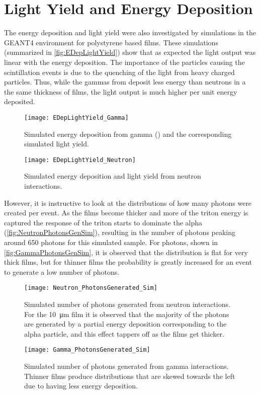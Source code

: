 \section{Light Yield and Energy Deposition}
The energy deposition and light yield were also investigated by simulations in the GEANT4 environment for polystyrene based films.
These simulations (summarized in \autoref{fig:EDepLightYield}) show that as expected the light output was linear with the energy deposition.
The importance of the particles causing the scintillation events is due to the quenching of the light from heavy charged particles.
Thus, while the gammas from  deposit  less energy than neutrons in a the same thickness of films, the light output is much higher per unit energy deposited.
\begin{figure}
 	\centering
  	\texttt{[image: EDepLightYield\_Gamma]}
		\caption[Energy Deposition and Light Yield in Polystyrene from Co-60 Photons]{Simulated energy deposition from gamma () and the corresponding simulated light yield. \SimEDeLYGeo}
\end{figure}
\begin{figure}
 	\centering
  	\texttt{[image: EDepLightYield\_Neutron]}
  	\caption[Energy Deposition and Light Yield in Polystyrene from Neutrons]{Simulated energy deposition and light yield from neutron interactions.  \SimEDeLYGeo}
  \label{fig:EDepLightYield}
\end{figure}
However, it is instructive to look at the distributions of how many photons were created per event.
As the films become thicker and more of the triton energy is captured the response of the triton starts to dominate the alpha (\autoref{fig:NeutronPhotonsGenSim}), resulting in the number of photons peaking around 650 photons for this simulated sample.
For photons, shown in \autoref{fig:GammaPhotonsGenSim}, it is observed that the distribution is flat for very thick films, but for thinner films the probability is greatly increased for an event to generate a low number of photons.
\begin{figure}
  \centering
  \texttt{[image: Neutron\_PhotonsGenerated\_Sim]}
  \caption[Number of photons generated from neutron interactions]{Simulated number of photons generated from neutron interactions.  For the \SI{10}{\um} film it is observed that the majority of the photons are generated by a partial energy deposition corresponding to the alpha particle, and this effect tappers off as the films get thicker. \SimEDeLYGeo}
  \label{fig:NeutronPhotonsGenSim}
\end{figure}
\begin{figure}
  \centering
  \texttt{[image: Gamma\_PhotonsGenerated\_Sim]}
  \caption[Number of photons generated from gamma interactions]{Simulated number of photons generated from gamma interactions. Thinner films produce distributions that are skewed towards the left due to having less energy deposition. \SimEDeLYGeo}
  \label{fig:GammaPhotonsGenSim}
\end{figure}
